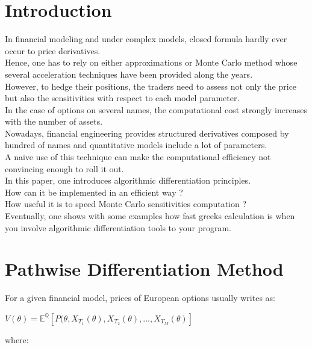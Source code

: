 \documentclass {article}
\begin{document}
	\section {Introduction}
	
		In financial modeling and under complex models, closed formula hardly ever occur to price derivatives. \\
		Hence, one has to rely on either approximations or Monte Carlo method whose several acceleration techniques have been 
		provided along the years. \\
		However, to hedge their positions, the traders need to assess not only the price but also the sensitivities with respect 
		to each model parameter. \\
		In the case of options on several names, the computational cost strongly increases with the number of assets. \\
		Nowadays, financial engineering provides structured derivatives composed by hundred of names and quantitative models 
		include a lot of parameters. \\
		A naive use of this technique can make the computational efficiency not convincing enough to roll it out. \\
		In this paper, one introduces algorithmic differentiation principles. \\
		How can it be implemented in an efficient way ? \\
		How useful it is to speed Monte Carlo sensitivities computation ? \\
		Eventually, one shows with some examples how fast greeks calculation is when you involve algorithmic differentiation tools 
		to your program. \\
	
	\section {Pathwise Differentiation Method}
	
		For a given financial model, prices of European options usually writes as:
		
		\begin{center}
			$V (\theta) = \mathbb{E}^{\mathbb{Q}}\left[ P (\theta, X_{T_{1}}(\theta), X_{T_{2}}(\theta), ..., X_{T_{M}}(\theta) \right]$
		\end{center}
		
		where:
		
\end{document}
